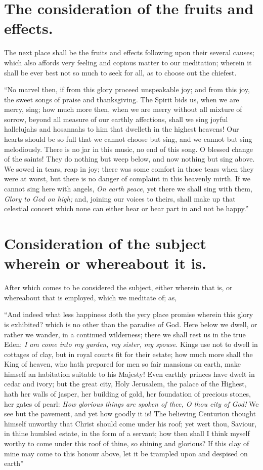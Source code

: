 \section{The consideration of the fruits and effects.}

The next place shall be the fruits and effects following upon their several causes; which also affords very feeling and copious matter to our meditation; wherein it shall be ever best not so much to seek for all, as to choose out the chiefest. 

``No marvel then, if from this glory proceed unspeakable joy; and from this joy, the sweet songs of praise and thanksgiving. The Spirit bids us, when we are merry, sing; how much more then, when we are merry without all mixture of sorrow, beyond all measure of our earthly affections, shall we sing joyful hallelujahs and hosannahs to him that dwelleth in the highest heavens! Our hearts should be so full that we cannot choose but sing, and we cannot but sing melodiously. There is no jar in this music, no end of this song. O blessed change of the saints! They do nothing but weep below, and now nothing but sing above. We sowed in tears, reap in joy; there was some comfort in those tears when they were at worst, but there is no danger of complaint in this heavenly mirth. If we cannot sing here with angels, \emph{On earth peace,} yet there we shall sing with them, \emph{Glory to God on high;} and, joining our voices to theirs, shall make up that celestial concert which none can either hear or bear part in and not be happy.''

\section{Consideration of the subject wherein or whereabout it is.}

After which comes to be considered the subject, either wherein that is, or whereabout that is employed, which we meditate of; as, 

``And indeed what less happiness doth the yery place promise wherein this glory is exhibited? which is no other than the paradise of God. Here below we dwell, or rather we wander, in a continued wilderness; there we shall rest us in the true Eden; \emph{I am come into my garden, my sister, my spouse.} Kings use not to dwell in cottages of clay, but in royal courts fit for their estate; how much more shall the King of heaven, who hath prepared for men so fair mansions on earth, make himself an habitation suitable to his Majesty! Even earthly princes have dwelt in cedar and ivory; but the great city, Holy Jerusalem, the palace of the Highest, hath her walls of jasper, her building of gold, her foundation of precious stones, her gates of pearl: \emph{How glorious things are spoken of thee, O thou city of God!} We see but the pavement, and yet how goodly it is! The believing Centurion thought himself unworthy that Christ should come under his roof; yet wert thou, Saviour, in thine humbled estate, in the form of a servant; how then shall I think myself worthy to come under this roof of thine, so shining and glorious? If this clay of mine may come to this honour above, let it be trampled upon and despised on earth''


